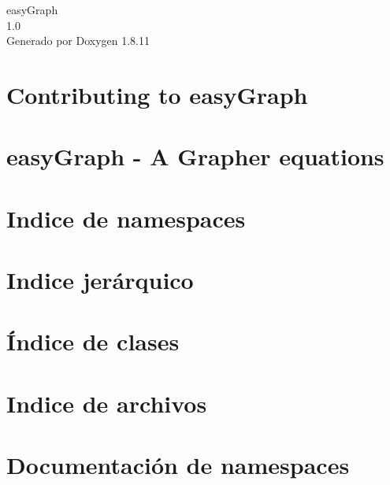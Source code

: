\documentclass[twoside]{book}
\newcommand{\+}{\discretionary{\mbox{\scriptsize$\hookleftarrow$}}{}{}}
\newcommand{\clearemptydoublepage}{%
  \newpage{\pagestyle{empty}\cleardoublepage}%
}
\begin{document}
\hypersetup{pageanchor=false,
             bookmarksnumbered=true,
             pdfencoding=unicode
            }
\begin{titlepage}
\vspace*{7cm}
\begin{center}%
{\Large easy\+Graph \\[1ex]\large 1.\+0 }\\
\vspace*{1cm}
{\large Generado por Doxygen 1.8.11}\\
\end{center}
\end{titlepage}
\clearemptydoublepage
\tableofcontents
\clearemptydoublepage
{}
\hypersetup{pageanchor=true}

\chapter{Contributing to easy\+Graph}
\label{md_CONTRIBUTING}
\hypertarget{md_CONTRIBUTING}{}

\chapter{easy\+Graph -\/ A Grapher equations}
\label{md_README}
\hypertarget{md_README}{}

\chapter{Indice de namespaces}

\chapter{Indice jerárquico}

\chapter{Índice de clases}

\chapter{Indice de archivos}

\chapter{Documentación de namespaces}



\end{document}
